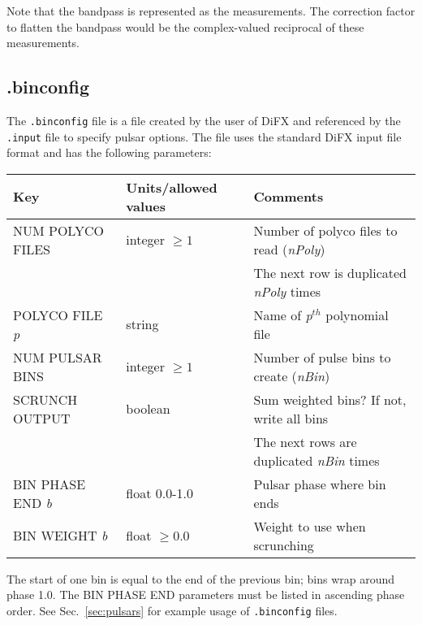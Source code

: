 Note that the bandpass is represented as the measurements.
The correction factor to flatten the bandpass would be the complex-valued reciprocal of these measurements.





\subsection{.binconfig} \label{sec:binconfig}

The {\tt .binconfig} file is a file created by the user of DiFX and referenced by the {\tt .input} file to specify pulsar options.
The file uses the standard DiFX input file format and has the following parameters:

\begin{center}
\begin{tabular}{l l l}
\hline
Key & Units/allowed values & Comments \\
\hline
NUM POLYCO FILES      & integer $\ge 1$ & Number of polyco files to read ({\em nPoly}) \\
                      &                 & The next row is duplicated {\em nPoly} times \\
POLYCO FILE {\em p}   & string          & Name of {\em p}$^{th}$ polynomial file \\
NUM PULSAR BINS       & integer $\ge 1$ & Number of pulse bins to create ({\em nBin}) \\
SCRUNCH OUTPUT        & boolean         & Sum weighted bins?  If not, write all bins \\
                      &                 & The next rows are duplicated {\em nBin} times \\
BIN PHASE END {\em b} & float 0.0-1.0   & Pulsar phase where bin ends \\
BIN WEIGHT {\em b}    & float $\ge 0.0$ & Weight to use when scrunching \\
\hline
\end{tabular}
\end{center}

The start of one bin is equal to the end of the previous bin; bins wrap around phase 1.0.
The BIN PHASE END parameters must be listed in ascending phase order.
See Sec.~\ref{sec:pulsars} for example usage of {\tt .binconfig} files.






